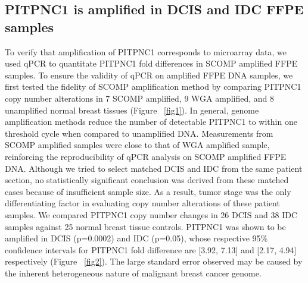 \documentclass[10pt,letterpaper]{article}
\begin{document}
\subsection*{PITPNC1 is amplified in DCIS and IDC FFPE samples}
To verify that amplification of PITPNC1 corresponds to microarray data, we used qPCR to quantitate PITPNC1 fold differences in SCOMP amplified FFPE samples. To ensure the validity of qPCR on amplified FFPE DNA samples, we first tested the fidelity of SCOMP amplification method by comparing PITPNC1 copy number alterations in 7 SCOMP amplified, 9 WGA amplified, and 8 unamplified normal breast tissues (Figure ~\ref{fig1}). In general, genome amplification methods reduce the number of detectable PITPNC1 to within one threshold cycle when compared to unamplified DNA. Measurements from SCOMP amplified samples were close to that of WGA amplified sample, reinforcing the reproducibility of qPCR analysis on SCOMP amplified FFPE DNA. Although we tried to select matched DCIS and IDC from the same patient section, no statistically significant conclusion was derived from these matched cases because of insufficient sample size. As a result, tumor stage was the only differentiating factor in evaluating copy number alterations of these patient samples. We compared PITPNC1 copy number changes in 26 DCIS and 38 IDC samples against 25 normal breast tissue controls. PITPNC1 was shown to be amplified in DCIS (p=0.0002) and IDC (p=0.05), whose respective 95\% confidence intervals for PITPNC1 fold difference are [3.92, 7.13] and [2.17, 4.94] respectively (Figure ~\ref{fig2}). The large standard error observed may be caused by the inherent heterogeneous nature of malignant breast cancer genome.
\end{document}
